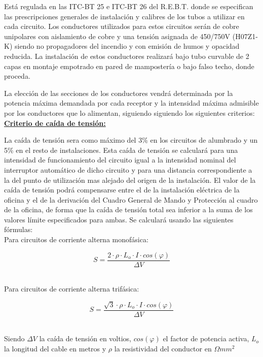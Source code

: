 Está regulada en las ITC-BT 25 e ITC-BT 26 del R.E.B.T. donde se especifican las prescripciones generales de instalación y calibres de los tubos a utilizar en cada circuito. Los conductores utilizados para estos circuitos serán de cobre unipolares con aislamiento de cobre y una tensión asignada de 450/750V (H07Z1-K) siendo no propagadores del incendio y con emisión de humos y opacidad reducida. La instalación de estos conductores realizará bajo tubo curvable de 2 capas en montaje empotrado en pared de mampostería o bajo falso techo, donde proceda.\\

\pagebreak

La elección de las secciones de los conductores vendrá determinada por la potencia máxima demandada por cada receptor y la intensidad máxima admisible por los conductores que lo alimentan, siguiendo siguiendo los siguientes criterios:\\

\underline{\bfseries Criterio de caída de tensión:}\

La caída de tensión sera como máximo del 3\% en los circuitos de alumbrado y un 5\% en el resto de instalaciones. Esta caída de tensión se calculará para una intensidad de funcionamiento del circuito igual a la intensidad nominal del interruptor automático de dicho circuito y para una distancia correspondiente a la del punto de utilización mas alejado del origen de la instalación. El valor de la caída de tensión podrá compensarse entre el de la instalación eléctrica de la oficina y el de la derivación del Cuadro General de Mando y Protección al cuadro de la oficina, de forma que la caída de tensión total sea inferior a la suma de los valores límite especificados para ambas. Se calculará usando las siguientes fórmulas:\\

Para circuitos de corriente alterna monofásica:\

$$ S=\frac{2\cdot \rho \cdot L_o	\cdot I\cdot cos(\varphi)}{\Delta V}$$\

Para circuitos de corriente alterna trifásica:\

$$ S=\frac{\sqrt{3} \cdot \rho \cdot L_o \cdot I\cdot cos(\varphi)}{\Delta V}$$\

Siendo $\Delta V$ la caída de tensión en voltios, $cos(\varphi)$ el factor de potencia activa, $L_o$ la longitud del cable en metros y $\rho$ la resistividad del conductor en $\Omega mm^2$\\


